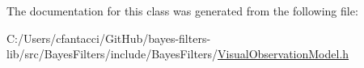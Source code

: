 The documentation for this class was generated from the following file\+:\begin{DoxyCompactItemize}
\item 
C\+:/\+Users/cfantacci/\+Git\+Hub/bayes-\/filters-\/lib/src/\+Bayes\+Filters/include/\+Bayes\+Filters/\mbox{\hyperlink{VisualObservationModel_8h}{Visual\+Observation\+Model.\+h}}\end{DoxyCompactItemize}
